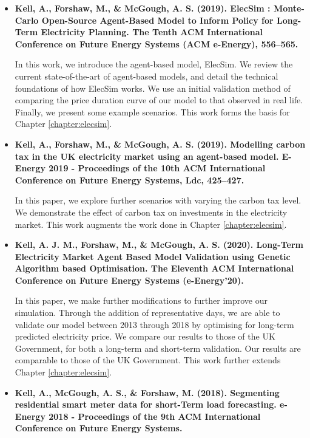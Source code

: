 \begin{itemize}
	
	\item[\textbf{\cite{Kell}}] \textbf{Kell, A., Forshaw, M., \& McGough, A. S. (2019). ElecSim : Monte-Carlo Open-Source Agent-Based Model to Inform Policy for Long-Term Electricity Planning. The Tenth ACM International Conference on Future Energy Systems (ACM e-Energy), 556–565.}
	
	In this work, we introduce the agent-based model, ElecSim. We review the current state-of-the-art of agent-based models, and detail the technical foundations of how ElecSim works. We use an initial validation method of comparing the price duration curve of our model to that observed in real life. Finally, we present some example scenarios. This work forms the basis for Chapter \ref{chapter:elecsim}.
	
	\item[\textbf{\cite{Kell2019a}}] \textbf{Kell, A., Forshaw, M., \& McGough, A. S. (2019). Modelling carbon tax in the UK electricity market using an agent-based model. E-Energy 2019 - Proceedings of the 10th ACM International Conference on Future Energy Systems, Ldc, 425–427. }
	
	In this paper, we explore further scenarios with varying the carbon tax level. We demonstrate the effect of carbon tax on investments in the electricity market. This work augments the work done in Chapter \ref{chapter:elecsim}.
	
	
	\item[\textbf{\cite{Kell2020}}] \textbf{Kell, A. J. M., Forshaw, M., \& McGough, A. S. (2020). Long-Term Electricity Market Agent Based Model Validation using Genetic Algorithm based Optimisation. The Eleventh ACM International Conference on Future Energy Systems (e-Energy’20).}
	
	In this paper, we make further modifications to further improve our simulation. Through the addition of representative days, we are able to validate our model between 2013 through 2018 by optimising for long-term predicted electricity price. We compare our results to those of the UK Government, for both a long-term and short-term validation. Our results are comparable to those of the UK Government. This work further extends Chapter \ref{chapter:elecsim}.
	
	\item[\textbf{\cite{Kell2018a}}] \textbf{Kell, A., McGough, A. S., \& Forshaw, M. (2018). Segmenting residential smart meter data for short-Term load forecasting. e-Energy 2018 - Proceedings of the 9th ACM International Conference on Future Energy Systems.}
	

\end{itemize}
